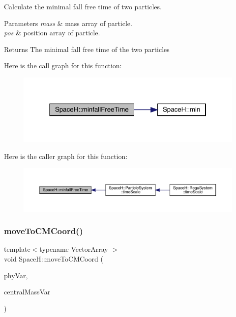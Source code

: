 Calculate the minimal fall free time of two particles. 


\begin{DoxyParams}{Parameters}
{\em mass} & mass array of particle. \\
\hline
{\em pos} & position array of particle. \\
\hline
\end{DoxyParams}
\begin{DoxyReturn}{Returns}
The minimal fall free time of the two particles 
\end{DoxyReturn}
Here is the call graph for this function\+:
\nopagebreak
\begin{figure}[H]
\begin{center}
\leavevmode
\includegraphics[width=318pt]{namespace_space_h_a604d09de4efdae2ecc200f2c7c68597a_cgraph}
\end{center}
\end{figure}
Here is the caller graph for this function\+:
\nopagebreak
\begin{figure}[H]
\begin{center}
\leavevmode
\includegraphics[width=350pt]{namespace_space_h_a604d09de4efdae2ecc200f2c7c68597a_icgraph}
\end{center}
\end{figure}
\mbox{\label{namespace_space_h_afb4e29bf684f5b98b6022db70cab0321}} 
\subsubsection{\texorpdfstring{move\+To\+C\+M\+Coord()}{moveToCMCoord()}}
{\footnotesize\ttfamily template$<$typename Vector\+Array $>$ \\
void Space\+H\+::move\+To\+C\+M\+Coord (\begin{DoxyParamCaption}\item[{Vector\+Array \&}]{phy\+Var,  }\item[{const typename Vector\+Array\+::value\+\_\+type \&}]{central\+Mass\+Var }\end{DoxyParamCaption})}



